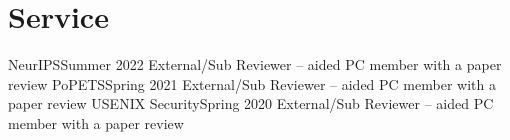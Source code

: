 \section{Service}
\CVSubHeadingListStart
    \CVSubheading
      {NeurIPS}{Summer 2022}
      {External/Sub Reviewer -- aided PC member with a paper review}{}
    \CVSubheading
      {PoPETS}{Spring 2021}
      {External/Sub Reviewer -- aided PC member with a paper review}{}
    \CVSubheading
      {USENIX Security}{Spring 2020}
      {External/Sub Reviewer -- aided PC member with a paper review}{}
  \CVSubHeadingListEnd